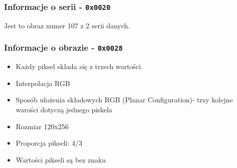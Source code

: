 \begin{frame}
	\frametitle{Informacje o serii - \texttt{0x0020}}
	Jest to obraz numer 107 z 2 serii danych.
\end{frame}

\begin{frame}
  \frametitle{Informacje o obrazie - \texttt{0x0028}}
\begin{itemize}
  \item Każdy piksel składa się z trzech wartości.
  \item Interpolacja RGB
  \item Sposób ułożenia składowych RGB (Planar Configuration)- trzy kolejne warości dotyczą jednego piskela
  \item Rozmiar 120x256
  \item Proporcja pikseli: 4/3
  \item Wartości pikseli są bez znaku
\end{itemize}
\end{frame}
